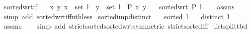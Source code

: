 \begin{isabellebody}
%
\endisatagproof
{\isafoldproof}%
%
\isadelimproof
\isanewline
%
\endisadelimproof
%
\isadeliminvisible
\isanewline
%
\endisadeliminvisible
%
\isataginvisible
{}\isamarkupfalse%
\ sorted{\isacharunderscore}{\kern0pt}wrt{\isacharunderscore}{\kern0pt}if{\isacharcolon}{\kern0pt}\isanewline
\ \ \ {\isachardoublequoteopen}{\isasymAnd}x\ y{\isachardot}{\kern0pt}\ x\ {\isasymin}\ set\ l\ {\isasymLongrightarrow}\ y\ {\isasymin}\ set\ l\ {\isasymLongrightarrow}\ P\ x\ y{\isachardoublequoteclose}\isanewline
\ \ \ {\isachardoublequoteopen}sorted{\isacharunderscore}{\kern0pt}wrt\ P\ l{\isachardoublequoteclose}%
\endisataginvisible
{\isafoldinvisible}%
%
\isadeliminvisible
\isanewline
%
\endisadeliminvisible
%
\isadelimproof
\ \ %
\endisadelimproof
%
\isatagproof
{}\isamarkupfalse%
\ assms\isanewline
\ \ \isamarkupfalse%
\ {\isacharparenleft}{\kern0pt}simp\ add{\isacharcolon}{\kern0pt}\ sorted{\isacharunderscore}{\kern0pt}wrt{\isacharunderscore}{\kern0pt}iff{\isacharunderscore}{\kern0pt}nth{\isacharunderscore}{\kern0pt}less{\isacharparenright}{\kern0pt}%
\endisatagproof
{\isafoldproof}%
%
\isadelimproof
%
\endisadelimproof
%
\isadeliminvisible
%
\endisadeliminvisible
%
\isataginvisible
%
\isamarkuptrue%
\isamarkupfalse%
\ sorted{\isacharunderscore}{\kern0pt}imp{\isacharunderscore}{\kern0pt}distinct{\isacharcolon}{\kern0pt}\isanewline
\ \ \ {\isachardoublequoteopen}sorted\ l{\isachardoublequoteclose}\isanewline
\ \ \ {\isachardoublequoteopen}distinct\ l{\isachardoublequoteclose}%
\endisataginvisible
{\isafoldinvisible}%
%
\isadeliminvisible
\isanewline
%
\endisadeliminvisible
%
\isadelimproof
\ \ %
\endisadelimproof
%
\isatagproof
{}\isamarkupfalse%
\ assms\isanewline
\ \ \isamarkupfalse%
\ {\isacharparenleft}{\kern0pt}simp\ add{\isacharcolon}{\kern0pt}\ strict{\isacharunderscore}{\kern0pt}sorted{\isacharunderscore}{\kern0pt}sorted{\isacharunderscore}{\kern0pt}wrt{\isacharbrackleft}{\kern0pt}symmetric{\isacharbrackright}{\kern0pt}\ strict{\isacharunderscore}{\kern0pt}sorted{\isacharunderscore}{\kern0pt}iff{\isacharparenright}{\kern0pt}%
\endisatagproof
{\isafoldproof}%
%
\isadelimproof
%
\endisadelimproof
%
\isadeliminvisible
%
\endisadeliminvisible
%
\isataginvisible
%
\isamarkupsubsubsection{%
}
\isamarkuptrue%
\isamarkupfalse%
\ list{\isacharunderscore}{\kern0pt}split{\isacharunderscore}{\kern0pt}tbd{\isacharcolon}{\kern0pt}\isanewline

\end{isabellebody}
